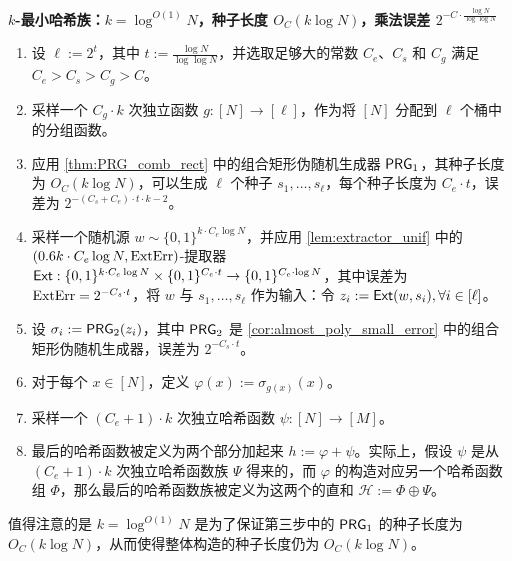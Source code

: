\begin{tcolorbox}[breakable]
    \textbf{$k$-最小哈希族：$k = \log^{O(1)} N$，种子长度 $O_C(k \log N)$，乘法误差 $2^{-C \cdot \frac{\log N}{\log \log N}}$}

    \begin{enumerate}
        \item 设 $\ell := 2^{t}$，其中 $t := \frac{\log N}{\log \log N}$，并选取足够大的常数 $C_e$、$C_s$ 和 $C_g$ 满足 $C_e > C_s > C_g > C$。
        
        \item 采样一个 $C_g \cdot k$ 次独立函数 $g : [N] \to [\ell]$，作为将 $[N]$ 分配到 $\ell$ 个桶中的分组函数。
        
        \item 应用 \cref{thm:PRG_comb_rect} 中的组合矩形伪随机生成器 $\mathsf{PRG}_1$，其种子长度为 $O_C(k \log N)$，可以生成 $\ell$ 个种子 $s_1, \ldots, s_{\ell}$，每个种子长度为 $C_e \cdot t$，误差为 $2^{-(C_s+C_e) \cdot t \cdot k - 2}$。
        
        \item 采样一个随机源 $w \sim \{0, 1\}^{k \cdot C_e \log N}$，并应用 \cref{lem:extractor_unif} 中的 $(0.6 k \cdot C_e \log N, \mathrm{ExtErr})$-提取器 $\mathsf{Ext}:\{0, 1\}^{k \cdot C_e \log N} \times \{0, 1\}^{C_e \cdot t} \to \{0, 1\}^{C_e \cdot \log N}$，其中误差为 $\mathrm{ExtErr} = 2^{-C_s \cdot t}$，将 $w$ 与 $s_1, \ldots, s_\ell$ 作为输入：令 $z_i := \mathsf{Ext}(w, s_i), \forall i \in [\ell]$。
        
        \item 设 $\sigma_i := \mathsf{PRG}_2(z_i)$，其中 $\mathsf{PRG}_2$ 是 \cref{cor:almost_poly_small_error} 中的组合矩形伪随机生成器，误差为 $2^{-C_s \cdot t}$。
        
        \item 对于每个 $x \in [N]$，定义 $\varphi(x) := \sigma_{g(x)}(x)$。
        
        \item 采样一个 $(C_e + 1) \cdot k$ 次独立哈希函数 $\psi : [N] \to [M]$。
            
        \item 最后的哈希函数被定义为两个部分加起来 $h := \varphi + \psi$。实际上，假设 $\psi$ 是从 $(C_e + 1) \cdot k$ 次独立哈希函数族 $\Psi$ 得来的，而 $\varphi$ 的构造对应另一个哈希函数组 $\Phi$，那么最后的哈希函数族被定义为这两个的直和 $\mathcal{H} := \Phi \oplus \Psi$。
    \end{enumerate}
\end{tcolorbox}

值得注意的是 $k = \log^{O(1)} N$ 是为了保证第三步中的 $\mathsf{PRG}_1$ 的种子长度为 $O_C(k \log N)$，从而使得整体构造的种子长度仍为 $O_C(k \log N)$。

